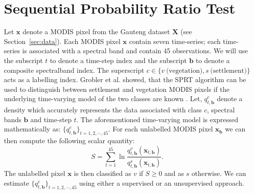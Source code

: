 \documentclass{article}
\begin{document}
\section{Sequential Probability Ratio Test}
\label{sec:sprt}
Let $\mathbf{x}$ denote a MODIS pixel from the Gauteng dataset $\mathbf{X}$ (see Section~\ref{sec:data}). Each MODIS pixel $\mathbf{x}$ contain seven time-series; each time-series is associated with a spectral band and contain 45 observations.
We will use the subscript $t$ to denote a time-step index and the subscript $\mathbf{b}$ to denote a composite spectralband index. The superscript $c\in\{v~\textrm{(vegetation)},s~\textrm{(settlement)}\}$ acts as a labelling index. Grobler et al. showed, that the SPRT algorithm can be used to distinguish between settlement and vegetation MODIS pixels if the underlying time-varying model of the two classes are known \cite{grobler2012c}. 
Let, $q_{t,\mathbf{b}}^c$ denote a density which accurately represents the data associated with class $c$, spectral bands $\mathbf{b}$ and time-step $t$. The aforementioned time-varying 
model is expressed mathematically as: $\{q_{t,\mathbf{b}}^c\}_{t=1,2,\cdots,45}$.
For each unlabelled MODIS pixel $\mathbf{x}_{\mathbf{b}}$ we can then compute the following scalar quantity: 
\begin{equation}
S = \sum_{t=1}^{45} \ln \frac{q_{t,\mathbf{b}}^v(\mathbf{x}_{t,\mathbf{b}})}{q_{t,\mathbf{b}}^s(\mathbf{x}_{t,\mathbf{b}})}. 
\end{equation}
The unlabelled pixel $\mathbf{x}$ is then classified as $v$ if $S\geq 0$ and as $s$ otherwise. We can estimate  $\{q_{t,\mathbf{b}}^c\}_{t=1,2,\cdots,45}$ using either a supervised or an unsupervised 
approach. 
\end{document}
